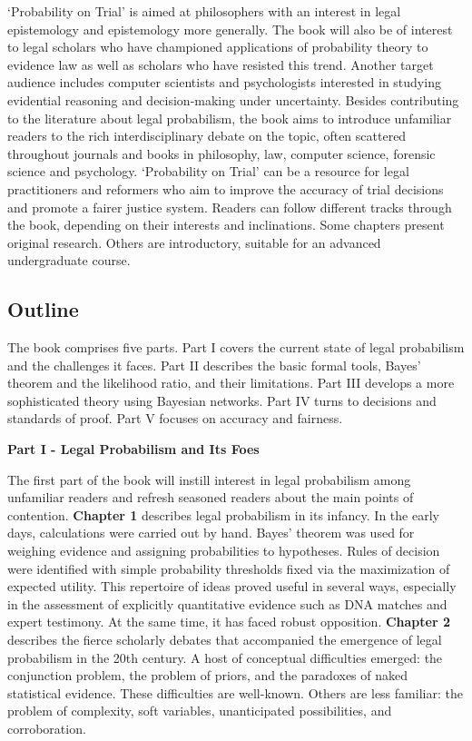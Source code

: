 \documentclass[
  10pt,
  dvipsnames,enabledeprecatedfontcommands]{scrartcl}
\begin{document}
`Probability on Trial' is aimed at philosophers with an interest in
legal epistemology and epistemology more generally. The book will also
be of interest to legal scholars who have championed applications of
probability theory to evidence law as well as scholars who have resisted
this trend. Another target audience includes computer scientists and
psychologists interested in studying evidential reasoning and
decision-making under uncertainty. Besides contributing to the
literature about legal probabilism, the book aims to introduce
unfamiliar readers to the rich interdisciplinary debate on the topic,
often scattered throughout journals and books in philosophy, law,
computer science, forensic science and psychology. `Probability on
Trial' can be a resource for legal practitioners and reformers who aim
to improve the accuracy of trial decisions and promote a fairer justice
system. Readers can follow different tracks through the book, depending
on their interests and inclinations. Some chapters present original
research. Others are introductory, suitable for an advanced
undergraduate course.

\hypertarget{outline}{%
\subsection{Outline}\label{outline}}

The book comprises five parts. Part I covers the current state of legal
probabilism and the challenges it faces. Part II describes the basic
formal tools, Bayes' theorem and the likelihood ratio, and their
limitations. Part III develops a more sophisticated theory using
Bayesian networks. Part IV turns to decisions and standards of proof.
Part V focuses on accuracy and fairness.

\vspace{2mm}

\noindent \textbf{Part I - Legal Probabilism and Its Foes}

\noindent The first part of the book will instill interest in legal
probabilism among unfamiliar readers and refresh seasoned readers about
the main points of contention. \textbf{Chapter 1} describes legal
probabilism in its infancy. In the early days, calculations were carried
out by hand. Bayes' theorem was used for weighing evidence and assigning
probabilities to hypotheses. Rules of decision were identified with
simple probability thresholds fixed via the maximization of expected
utility. This repertoire of ideas proved useful in several ways,
especially in the assessment of explicitly quantitative evidence such as
DNA matches and expert testimony. At the same time, it has faced robust
opposition. \textbf{Chapter 2} describes the fierce scholarly debates
that accompanied the emergence of legal probabilism in the 20th century.
A host of conceptual difficulties emerged: the conjunction problem, the
problem of priors, and the paradoxes of naked statistical evidence.
These difficulties are well-known. Others are less familiar: the problem
of complexity, soft variables, unanticipated possibilities, and
corroboration.
\end{document}
